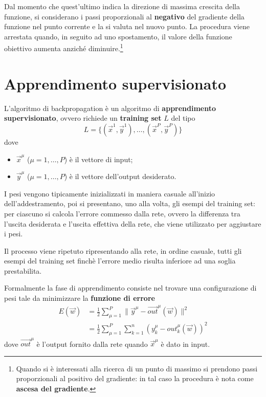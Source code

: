 Dal momento che quest'ultimo indica la direzione di massima crescita della funzione, si considerano i passi proporzionali al \textbf{negativo} del gradiente della funzione nel punto corrente e la si valuta nel nuovo punto. La procedura viene arrestata quando, in seguito ad uno spostamento, il valore della funzione obiettivo aumenta anziché diminuire.\footnote{Quando si è interessati alla ricerca di un punto di massimo si prendono passi proporzionali al positivo del gradiente: in tal caso la procedura è nota come \textbf{ascesa del gradiente}.}

\section{Apprendimento supervisionato}
\label{sec:apprendimento_supervisionato}

L'algoritmo di backpropagation è un algoritmo di \textbf{apprendimento supervisionato}, ovvero richiede un \textbf{training set} $L$ del tipo
\begin{displaymath}
	L = \{(\vec{x}^1, \vec{y}^1), \dots, (\vec{x}^P, \vec{y}^P) \}
\end{displaymath}
dove
\begin{itemize}
	\item $\vec{x}^\mu$ ($\mu=1, \dots, P$) è il vettore di input;
	\item $\vec{y}^\mu$ ($\mu=1, \dots, P$) è il vettore dell'output desiderato.
\end{itemize}
I pesi vengono tipicamente inizializzati in maniera casuale all'inizio dell'addestramento, poi si presentano, uno alla volta, gli esempi del training set: per ciascuno si calcola l'errore commesso dalla rete, ovvero la differenza tra l'uscita desiderata e l'uscita effettiva della rete, che viene utilizzato per aggiustare i pesi.

Il processo viene ripetuto ripresentando alla rete, in ordine casuale, tutti gli esempi del training set finchè l'errore medio risulta inferiore ad una soglia prestabilita.

Formalmente la fase di apprendimento consiste nel trovare una configurazione di pesi tale da minimizzare la \textbf{funzione di errore}
\begin{align*}
	E(\vec{w}) &= \frac{1}{2} \sum_{\mu=1}^P \| \vec{y}^\mu- \vec{out}^\mu (\vec{w}) \|^2 \\
	&= \frac{1}{2} \sum_{\mu=1}^P \sum_{k=1}^n \left(y_k^\mu - out_k^\mu (\vec{w})\right)^2
\end{align*}
dove $\vec{out}^\mu$ è l'output fornito dalla rete quando $\vec{x}^\mu$ è dato in input.

